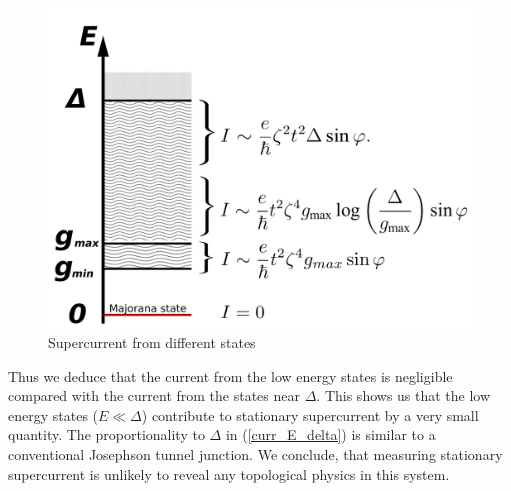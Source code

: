 \begin{figure}[H]
	\centering
	\includegraphics[width=0.7\linewidth]{images/supercurrent}
	\caption{Supercurrent from different states}
	\label{fig:supercurrent}
\end{figure}



 Thus we deduce that the current from the low energy states is negligible compared with the current from the states near $ \Delta. $ This shows us that the low energy states ($ E\ll\Delta $) contribute to stationary supercurrent by a very small quantity. The proportionality to $ \Delta $ in (\ref{curr_E_delta}) is similar to  a conventional Josephson tunnel junction. We conclude, that measuring stationary supercurrent is unlikely to reveal any topological physics in this system.


